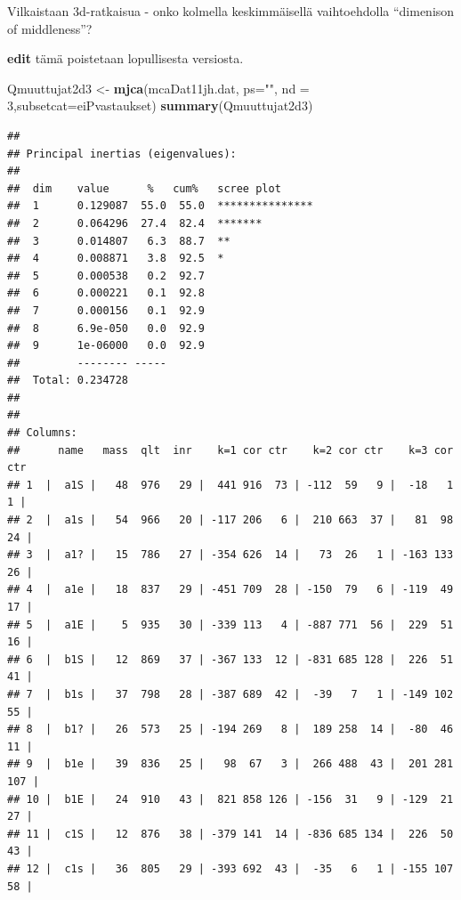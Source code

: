\documentclass[
  finnish,
]{book}
\newenvironment{Shaded}{\begin{snugshade}}{\end{snugshade}}
\newcommand{\DataTypeTok}[1]{\textcolor[rgb]{0.13,0.29,0.53}{#1}}
\newcommand{\DecValTok}[1]{\textcolor[rgb]{0.00,0.00,0.81}{#1}}
\newcommand{\KeywordTok}[1]{\textcolor[rgb]{0.13,0.29,0.53}{\textbf{#1}}}
\newcommand{\NormalTok}[1]{#1}
\newcommand{\StringTok}[1]{\textcolor[rgb]{0.31,0.60,0.02}{#1}}
\begin{document}
Vilkaistaan 3d-ratkaisua - onko kolmella keskimmäisellä vaihtoehdolla
``dimenison of middleness''?

\textbf{edit} tämä poistetaan lopullisesta versiosta.

\begin{Shaded}
\begin{Highlighting}[]
\NormalTok{Qmuuttujat2d3  <-}\StringTok{ }\KeywordTok{mjca}\NormalTok{(mcaDat11jh.dat, }\DataTypeTok{ps=}\StringTok{""}\NormalTok{, }\DataTypeTok{nd =} \DecValTok{3}\NormalTok{,}\DataTypeTok{subsetcat=}\NormalTok{eiPvastaukset)}
\KeywordTok{summary}\NormalTok{(Qmuuttujat2d3)}
\end{Highlighting}
\end{Shaded}

\begin{verbatim}
## 
## Principal inertias (eigenvalues):
## 
##  dim    value      %   cum%   scree plot               
##  1      0.129087  55.0  55.0  ***************          
##  2      0.064296  27.4  82.4  *******                  
##  3      0.014807   6.3  88.7  **                       
##  4      0.008871   3.8  92.5  *                        
##  5      0.000538   0.2  92.7                           
##  6      0.000221   0.1  92.8                           
##  7      0.000156   0.1  92.9                           
##  8      6.9e-050   0.0  92.9                           
##  9      1e-06000   0.0  92.9                           
##         -------- -----                                 
##  Total: 0.234728                                       
## 
## 
## Columns:
##      name   mass  qlt  inr    k=1 cor ctr    k=2 cor ctr    k=3 cor ctr  
## 1  |  a1S |   48  976   29 |  441 916  73 | -112  59   9 |  -18   1   1 |
## 2  |  a1s |   54  966   20 | -117 206   6 |  210 663  37 |   81  98  24 |
## 3  |  a1? |   15  786   27 | -354 626  14 |   73  26   1 | -163 133  26 |
## 4  |  a1e |   18  837   29 | -451 709  28 | -150  79   6 | -119  49  17 |
## 5  |  a1E |    5  935   30 | -339 113   4 | -887 771  56 |  229  51  16 |
## 6  |  b1S |   12  869   37 | -367 133  12 | -831 685 128 |  226  51  41 |
## 7  |  b1s |   37  798   28 | -387 689  42 |  -39   7   1 | -149 102  55 |
## 8  |  b1? |   26  573   25 | -194 269   8 |  189 258  14 |  -80  46  11 |
## 9  |  b1e |   39  836   25 |   98  67   3 |  266 488  43 |  201 281 107 |
## 10 |  b1E |   24  910   43 |  821 858 126 | -156  31   9 | -129  21  27 |
## 11 |  c1S |   12  876   38 | -379 141  14 | -836 685 134 |  226  50  43 |
## 12 |  c1s |   36  805   29 | -393 692  43 |  -35   6   1 | -155 107  58 |

\end{verbatim}
\end{document}
